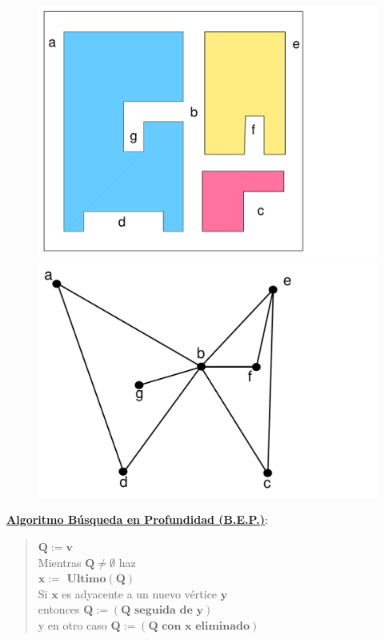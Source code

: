 \documentclass[ebook,oneside]{memoir}
\newcommand{\bolds}[1]{\boldsymbol{#1}}
\begin{document}
      \begin{center}
           \begin{figure}[h!]\centering
           \includegraphics[scale=0.15]{B1.pdf}
           \includegraphics[scale=0.2]{B2.pdf}
           \end{figure}
      \end{center}


\vspace{0.2cm}
\noindent\underline{\textbf{Algoritmo B\'{u}squeda en Profundidad (B.E.P.)}}:

        \begin{quotation}
        \noindent $\bolds{Q:=v}$\\[1ex]
        \textsf{Mientras} $\bolds{Q\neq\emptyset}$ \textsf{haz}\\[1ex]
        \hspace*{5ex} $\bolds{x:=\mbox{ Ultimo}(Q)}$\\[1ex]
        \hspace*{5ex} \textsf{Si} $\bolds{x}$ es adyacente a un nuevo v\'{e}rtice $\bolds{y}$\\[1ex]
        \hspace*{10ex} \textsf{entonces} $\bolds{Q:=(Q\mbox{ seguida de }y)}$\\[1ex]
        \hspace*{10ex} \textsf{y en otro caso} $\bolds{Q:=(Q\mbox{ con }x\mbox{ eliminado})}$
        \end{quotation}
\end{document}
